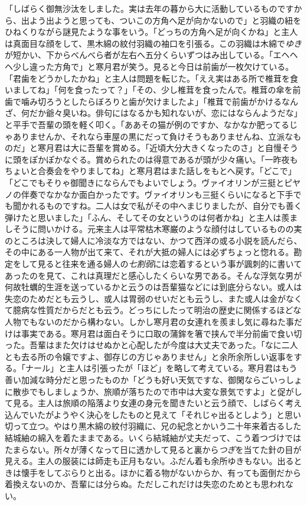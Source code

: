 \documentclass[12pt, openright]{book}
\begin{document}
「しばらく御無沙汰をしました。実は去年の暮から大に活動しているものですから、出よう出ようと思っても、ついこの方角へ足が向かないので」と羽織の紐をひねくりながら謎見たような事をいう。「どっちの方角へ足が向くかね」と主人は真面目な顔をして、黒木綿の紋付羽織の袖口を引張る。この羽織は木綿で\emph{ゆき}が短かい、下からべんべら者が左右へ五分くらいずつはみ出している。「エヘヘヘ少し違った方角で」と寒月君が笑う。見ると今日は前歯が一枚欠けている。「君歯をどうかしたかね」と主人は問題を転じた。「ええ実はある所で椎茸を食いましてね」「何を食ったって？」「その、少し椎茸を食ったんで。椎茸の傘を前歯で噛み切ろうとしたらぼろりと歯が欠けましたよ」「椎茸で前歯がかけるなんざ、何だか爺々臭いね。俳句にはなるかも知れないが、恋にはならんようだな」と平手で吾輩の頭を軽く叩く。「ああその猫が例のですか、なかなか肥ってるじゃありませんか、それなら車屋の黒にだって負けそうもありませんね、立派なものだ」と寒月君は大に吾輩を賞める。「近頃大分大きくなったのさ」と自慢そうに頭をぽかぽかなぐる。賞められたのは得意であるが頭が少々痛い。「一昨夜もちょいと合奏会をやりましてね」と寒月君はまた話しをもとへ戻す。「どこで」「どこでもそりゃ御聞きにならんでもよいでしょう。ヴァイオリンが三挺とピヤノの伴奏でなかなか面白かったです。ヴァイオリンも三挺くらいになると下手でも聞かれるものですね。二人は女で私がその中へまじりましたが、自分でも善く弾けたと思いました」「ふん、そしてその女というのは何者かね」と主人は羨ましそうに問いかける。元来主人は平常枯木寒巌のような顔付はしているものの実のところは決して婦人に冷淡な方ではない、かつて西洋の或る小説を読んだら、その中にある一人物が出て来て、それが大抵の婦人には必ずちょっと惚れる。勘定をして見ると往来を通る婦人の\emph{七割弱}には恋着するという事が諷刺的に書いてあったのを見て、これは真理だと感心したくらいな男である。そんな浮気な男が何故牡蠣的生涯を送っているかと云うのは吾輩猫などには到底分らない。或人は失恋のためだとも云うし、或人は胃弱のせいだとも云うし、また或人は金がなくて臆病な性質だからだとも云う。どっちにしたって明治の歴史に関係するほどな人物でもないのだから構わない。しかし寒月君の女連れを羨まし気に尋ねた事だけは事実である。寒月君は面白そうに口取の蒲鉾を箸で挟んで半分前歯で食い切った。吾輩はまた欠けはせぬかと心配したが今度は大丈夫であった。「なに二人とも去る所の令嬢ですよ、御存じの方じゃありません」と余所余所しい返事をする。「ナール」と主人は引張ったが「ほど」を略して考えている。寒月君はもう善い加減な時分だと思ったものか「どうも好い天気ですな、御閑ならごいっしょに散歩でもしましょうか、旅順が落ちたので市中は大変な景気ですよ」と促がして見る。主人は旅順の陥落より女連の身元を聞きたいと云う顔で、しばらく考え込んでいたがようやく決心をしたものと見えて「それじゃ出るとしよう」と思い切って立つ。やはり黒木綿の紋付羽織に、兄の紀念とかいう二十年来着古るした結城紬の綿入を着たままである。いくら結城紬が丈夫だって、こう着つづけではたまらない。所々が薄くなって日に透かして見ると裏から\emph{つぎ}を当てた針の目が見える。主人の服装には師走も正月もない。ふだん着も余所ゆきもない。出るときは懐手をしてぶらりと出る。ほかに着る物がないからか、有っても面倒だから着換えないのか、吾輩には分らぬ。ただしこれだけは失恋のためとも思われない。
\end{document}
